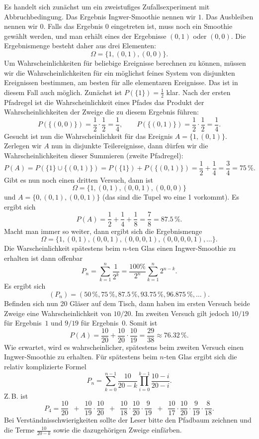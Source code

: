 \documentclass[a4paper,10pt,fleqn,twoside]{scrartcl}
\numberwithin{equation}{section}
\newcommand{\strong}[1]{{\normalfont\sffamily\bfseries #1}}
\theoremstyle{Aufgabe}
\begin{document}
\noindent\strong{Lösung.}
Es handelt sich zunächst um ein zweistufiges Zufallsexperiment
mit Abbruchbedingung. Das Ergebnis Ingwer-Smoothie nennen wir $1$.
Das Ausbleiben nennen wir $0$. Falls das Ergebnis $0$ eingetreten ist,
muss noch ein Smoothie gewählt werden, und man erhält eines der
Ergebnisse $(0,1)$ oder $(0,0)$. Die Ergebnismenge besteht daher
aus drei Elementen:
\[\Omega = \{1,(0,1),(0,0)\}.\]
Um Wahrscheinlichkeiten für beliebige Ereignisse berechnen zu können,
müssen wir die Wahrscheinlichkeiten für ein möglichst feines System
von disjunkten Ereignissen bestimmen, am besten für alle elementaren
Ereignisse. Das ist in diesem Fall auch möglich. Zunächst ist
$P(\{1\})=\frac{1}{2}$ klar. Nach der ersten Pfadregel ist die
Wahrscheinlichkeit eines Pfades das Produkt der
Wahrscheinlichkeiten der Zweige die zu diesem Ergebnis führen:%
\[P(\{(0,0)\}) = \frac{1}{2}\cdot\frac{1}{2} = \frac{1}{4},\qquad
P(\{(0,1)\}) = \frac{1}{2}\cdot\frac{1}{2} = \frac{1}{4}.
\]
Gesucht ist nun die Wahrscheinlichkeit für das Ereignis
$A=\{1,(0,1)\}$. Zerlegen wir $A$ nun in disjunkte Teilereignisse,
dann dürfen wir die Wahrscheinlichkeiten dieser Summieren (zweite
Pfadregel):
\[P(A) = P(\{1\}\cup\{(0,1)\}) = P(\{1\})+P(\{(0,1)\})
= \frac{1}{2}+\frac{1}{4} = \frac{3}{4} = 75\,\%.\]
Gibt es nun noch einen dritten Versuch, dann ist
\[\Omega = \{1,(0,1),(0,0,1),(0,0,0)\}\]
und $A=\{0,(0,1),(0,0,1)\}$ (das sind die Tupel wo eine 1 vorkommt).
Es ergibt sich
\[P(A) = \frac{1}{2}+\frac{1}{4}+\frac{1}{8} = \frac{7}{8} = 87.5\,\%.\]
Macht man immer so weiter, dann ergibt sich die Ergebnismenge
\[\Omega = \{1,(0,1),(0,0,1),(0,0,0,1),(0,0,0,0,1),\ldots\}.\]
Die Warscheinlichkeit spätestens beim $n$-ten Glas einen Ingwer-Smoothie
zu erhalten ist dann offenbar
\[P_n = \sum_{k=1}^n \frac{1}{2^k} = \frac{100\%}{2^n}\sum_{k=1}^n 2^{n-k}.\]
Es ergibt sich
\[(P_n) = (50\,\%,75\,\%,87.5\,\%,93.75\,\%,96.875\,\%,\ldots).\]
Befinden sich nun 20 Gläser auf dem Tisch, dann haben im ersten
Versuch beide Zweige eine Wahrscheinlichkeit von $10/20$. Im
zweiten Versuch gilt jedoch $10/19$ für Ergebnis~$1$ und $9/19$ für
Ergebnis~$0$. Somit ist
\[P(A) = \frac{10}{20}+\frac{10}{20}\cdot\frac{10}{19}
= \frac{29}{38} \approx 76.32\,\%.\]
Wie erwartet, wird es wahrscheinlicher, spätestens beim zweiten
Versuch einen Ingwer-Smoothie zu erhalten. Für spätestens beim $n$-ten
Glas ergibt sich die relativ komplizierte Formel
\[P_n = \sum_{k=0}^{n-1} \frac{10}{20-k}\prod_{i=0}^{k-1} \frac{10-i}{20-i}.\]
Z.\,B. ist
\[P_4 = \frac{10}{20}\enspace +\enspace\frac{10}{19}\cdot \frac{10}{20}
\enspace +\enspace\frac{10}{18}\cdot\frac{10}{20}\cdot\frac{9}{19}
\enspace +\enspace\frac{10}{17}\cdot\frac{10}{20}\cdot\frac{9}{19}\cdot\frac{8}{18}.\]
Bei Verständnisschwierigkeiten sollte der Leser bitte den Pfadbaum
zeichnen und die Terme $\frac{10}{20-k}$ sowie die dazugehörigen
Zweige einfärben.
\end{document}
